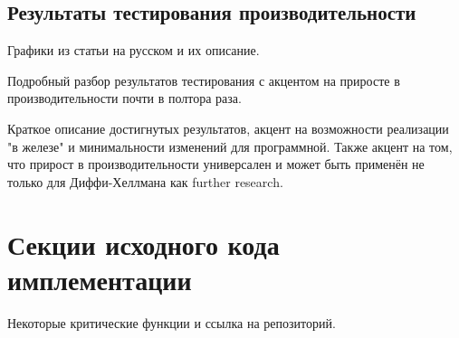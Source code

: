 \documentclass[times,specification,annotation]{itmo-student-thesis}
\begin{document}
\section{Результаты тестирования производительности}\label{sec:results}

Графики из статьи на русском и их описание.

\chapterconclusion

Подробный разбор результатов тестирования с акцентом на приросте в производительности почти в полтора раза.

\startconclusionpage

Краткое описание достигнутых результатов, акцент на возможности реализации "в железе"
и минимальности изменений для программной.
Также акцент на том, что прирост в производительности универсален и может быть применён не только для Диффи-Хеллмана
как further research.

\printmainbibliography


\appendix

\chapter{Секции исходного кода имплементации}\label{sec:app:1}

    Некоторые критические функции и ссылка на репозиторий.
\end{document}
